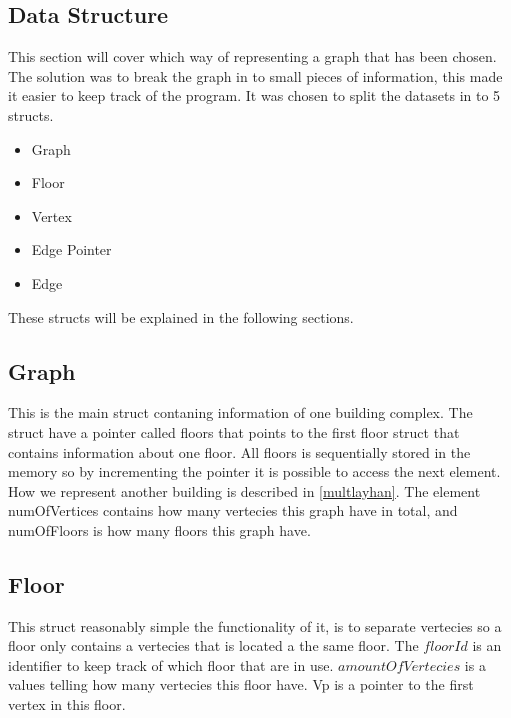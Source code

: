 
\subsection{Data Structure} %
\label{sub:data_structure}

This section will cover which way of representing a graph that has been chosen. The solution was to break the graph in to small pieces of information, this made it easier to keep track of the program. It was chosen to split the datasets in to 5 structs.
\begin{itemize}[noitemsep]
	\item Graph
	\item Floor
	\item Vertex
	\item Edge Pointer
	\item Edge
\end{itemize}

These structs will be explained in the following sections. 

\begin{minipage}{\linewidth}
\subsection{Graph} 
This is the main struct contaning information of one building complex.
The struct have a pointer called floors that points to the first floor struct that contains information about one floor. All floors is sequentially stored in the memory so by incrementing the pointer it is possible to access the next element. How we represent another building is described in \cref{multlayhan}. The element numOfVertices contains how many vertecies this graph have in total, and numOfFloors is how many floors this graph have.


 \label{Graph_struct}
\end{minipage}

\begin{minipage}{\linewidth}
\subsection{Floor} \label{subsub:floor}
This struct reasonably simple the functionality of it, is to separate vertecies so a floor only contains a vertecies that is located a the same floor. The $floorId$ is an identifier to keep track of which floor that are in use.
$amountOfVertecies$ is a values telling how many vertecies this floor have. Vp is a pointer to the first vertex in this floor.

 \label{Floor_struct}
\end{minipage}


